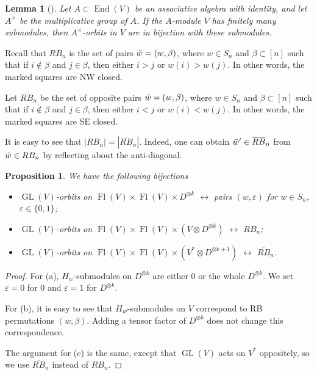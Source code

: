 \documentclass[12pt,a4paper]{article}
\def\Fl{\operatorname{Fl}}
\def\GL{\operatorname{GL}}
\def\FlVV{\Fl(V) \times \Fl(V)}
\theoremstyle{plain}
\newtheorem{prop}[thm]{Proposition}
\newtheorem{lemma}[thm]{Lemma}
\theoremstyle{definition}
\theoremstyle{remark}
\newcommand{\oRB}{\overline{RB}}
\newcommand{\eps}{\varepsilon}
\begin{document}
   \begin{lemma}[{\cite[Lemma 1]{travkin2009mirabolic}}]\label{lem:orbit-submodule}
        Let $A \subset \operatorname{End}(V)$ be an associative algebra with identity, and let $A^\times$ be the multiplicative group of $A$. If the $A$-module $V$ has finitely many submodules, then $A^\times$-orbits in $V$ are in bijection with these submodules.
    \end{lemma}

    Recall that $RB_n$ is the set of pairs $\Tilde{w} = (w,\beta)$, where $w\in S_n$ and $\beta \subset [n]$ such that if $i\notin \beta$ and $j \in \beta$, then either $i > j$ or $w(i) > w(j)$. In other words, the marked squares are NW closed. 
    
    Let $\oRB_n$ be the set of opposite pairs $\Tilde{w} = (w,\beta)$, where $w\in S_n$ and $\beta \subset [n]$ such that if $i\notin \beta$ and $j \in \beta$, then either $i < j$ or $w(i) < w(j)$. In other words, the marked squares are SE closed.

    It is easy to see that $|RB_n| = |\oRB_n|$. Indeed, one can obtain $\Tilde{w}'\in \oRB_n$ from $\Tilde{w}\in RB_n$ by reflecting about the anti-diagonal.

    \begin{prop}
        We have the following bijections
        \begin{itemize}
            \item[(a)] $\GL(V)$-orbits on $\FlVV\times D^{\otimes k}$ $\longleftrightarrow$ pairs $(w,\eps)$ for $w\in S_n$, $\eps\in\{0,1\}$;
            \item[(b)] $\GL(V)$-orbits on $\FlVV\times (V\otimes D^{\otimes k})$ $\longleftrightarrow$ $RB_n$;
            \item[(c)] $\GL(V)$-orbits on $\FlVV\times (V^*\otimes D^{\otimes k+1})$ $\longleftrightarrow$ $\oRB_n$.
        \end{itemize}
    \end{prop}

    \begin{proof}
        For (a), $H_w$-submodules on $D^{\otimes k}$ are either $0$ or the whole $D^{\otimes k}$. We set $\eps = 0$ for $0$ and $\eps = 1$ for $D^{\otimes k}$.

        For (b), it is easy to see that $H_w$-submodules on $V$ correspond to RB permutations $(w,\beta)$. Adding a tensor factor of $D^{\otimes k}$ does not change this correspondence.

        The argument for (c) is the same, except that $\GL(V)$ acts on $V^*$ oppositely, so we use $\oRB_n$ instead of $RB_n$.
    \end{proof}
\end{document}
